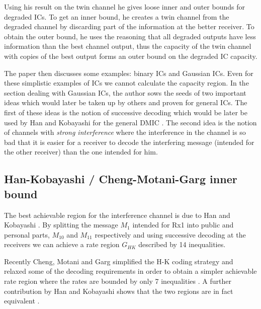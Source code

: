 \documentclass[aps,11pt,twoside,letterpaper]{article}
\begin{document}
            Using his result on the twin channel he gives loose inner and outer bounds for  
            degraded ICs. To get an inner bound, he creates a twin channel from the 
            degraded channel by discarding part of the information at the better receiver.
            To obtain the outer bound, he uses the reasoning that all degraded outputs
            have less information than the best channel output, thus the capacity of the
            twin channel with copies of the best output forms an outer bound on the degraded IC capacity.
            
            The paper then discusses some examples: binary ICs and Gaussian ICs.
            Even for these simplistic examples of ICs we cannot calculate the capacity region.
            In the section dealing with Gaussian ICs, the author sows the seeds of two
            important ideas which would later be taken up by others and proven for general ICs.
            The first of these ideas is the notion of successive decoding which would be
            later be used by Han and Kobayashi for the general DMIC \cite{HK81}.
            The second idea is the notion of channels with \emph{strong interference} where the 
            interference in the channel is so bad that it is easier for a receiver to decode the interfering
            message (intended for the other receiver) than the one intended for him.
            
        
    \subsection{Han-Kobayashi / Cheng-Motani-Garg inner bound}


        The best achievable region for the interference channel is due to Han and Kobayashi \cite{HK81}.
        By splitting the message $M_1$ intended for Rx1 into public and personal parts, 
        $M_{10}$ and $M_{11}$ respectively and using successive  decoding at the receivers
        we can achieve a rate region $G_{HK}$ described by 14 inequalities.
        
        Recently Cheng, Motani and Garg simplified the H-K coding strategy and relaxed some 
        of the decoding requirements in order to obtain a simpler achievable rate region where the rates
        are bounded by only 7 inequalities \cite{CMGE08}.
        A further contribution by Han and Kobayashi shows that the two regions are in fact 
        equivalent \cite{kobayashi2007further}.
        
\end{document}
